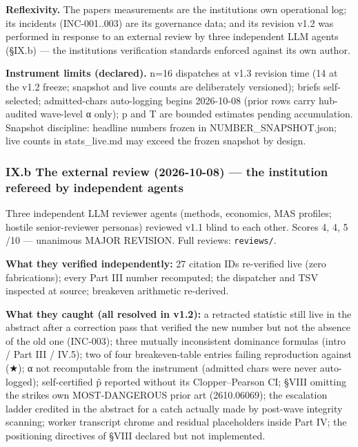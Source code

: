 \documentclass[
]{article}
\begin{document}
\textbf{Reflexivity.} The paper\textquotesingle s measurements are the
institution\textquotesingle s own operational log; its incidents
(INC-001..003) are its governance data; and its revision v1.2 was
performed in response to an external review by three independent LLM
agents (§IX.b) --- the institution\textquotesingle s verification
standards enforced against its own author.

\textbf{Instrument limits (declared).} n=16 dispatches at v1.3 revision
time (14 at the v1.2 freeze; snapshot and live counts are deliberately
versioned); briefs self-selected; admitted-chars auto-logging begins
2026-10-08 (prior rows carry hub-audited wave-level α only); p and T are
bounded estimates pending accumulation. Snapshot discipline: headline
numbers frozen in NUMBER\_SNAPSHOT.json; live counts in stats\_live.md
may exceed the frozen snapshot by design.

\subsubsection{IX.b The external review (2026-10-08) --- the institution
refereed by independent
agents}\label{ixb-the-external-review-2026-10-08--the-institution-refereed-by-independent-agents}

Three independent LLM reviewer agents (methods, economics, MAS profiles;
hostile senior-reviewer personas) reviewed v1.1 blind to each other.
Scores 4, 4, 5 /10 --- unanimous MAJOR REVISION. Full reviews:
\texttt{reviews/}.

\textbf{What they verified independently:} 27 citation IDs re-verified
live (zero fabrications); every Part III number recomputed; the
dispatcher and TSV inspected at source; breakeven arithmetic re-derived.

\textbf{What they caught (all resolved in v1.2):} a retracted statistic
still live in the abstract after a correction pass that verified the new
number but not the absence of the old one (INC-003); three mutually
inconsistent dominance formulas (intro / Part III / IV.5); two of four
breakeven-table entries failing reproduction against (★); α not
recomputable from the instrument (admitted chars were never
auto-logged); self-certified p̂ reported without its Clopper--Pearson CI;
§VIII omitting the strike\textquotesingle s own MOST-DANGEROUS prior art
(2610.06069); the escalation ladder credited in the abstract for a catch
actually made by post-wave integrity scanning; worker transcript chrome
and residual placeholders inside Part IV; the positioning directives of
§VIII declared but not implemented.
\end{document}
